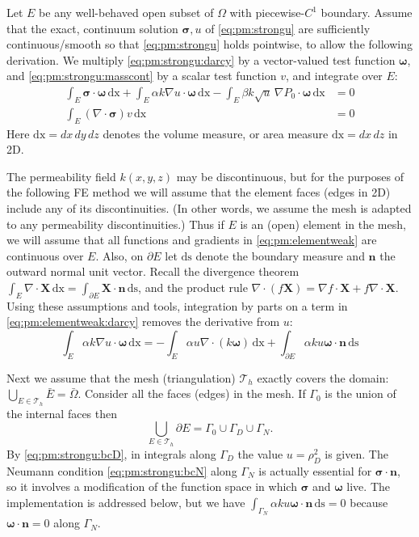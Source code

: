 \documentclass[11pt]{amsart}
\newcommand{\bn}{\mathbf{n}}
\newcommand{\bX}{\mathbf{X}}
\newcommand{\bsigma}{\bm{\sigma}}
\newcommand{\bomega}{\bm{\omega}}
\newcommand{\cT}{\mathcal{T}}
\newcommand{\dx}{\mathrm{dx}}
\newcommand{\ds}{\mathrm{ds}}
\newcommand{\Div}{\nabla\cdot}
\newcommand{\grad}{\nabla}
\begin{document}
Let $E$ be any well-behaved open subset of $\Omega$ with piecewise-$C^1$ boundary.  Assume that the exact, continuum solution $\bsigma,u$ of \eqref{eq:pm:strongu} are sufficiently continuous/smooth so that \eqref{eq:pm:strongu} holds pointwise, to allow the following derivation.  We multiply \eqref{eq:pm:strongu:darcy} by a vector-valued test function $\bomega$, and \eqref{eq:pm:strongu:masscont} by a scalar test function $v$, and integrate over $E$:
\begin{subequations}
\label{eq:pm:elementweak}
\begin{align}
\int_E \bsigma\cdot \bomega\,\dx + \int_E \alpha k \grad u \cdot \bomega\,\dx - \int_E \beta k \sqrt{u}\,\grad P_0 \cdot \bomega\,\dx &= 0 \label{eq:pm:elementweak:darcy} \\
\int_E (\Div \bsigma) v\,\dx &= 0 \label{eq:pm:elementweak:masscont}
\end{align}
\end{subequations}
Here $\dx = dx\,dy\,dz$ denotes the volume measure, or area measure $\dx = dx\,dz$ in 2D.

The permeability field $k(x,y,z)$ may be discontinuous, but for the purposes of the following FE method we will assume that the element faces (edges in 2D) include any of its discontinuities.  (In other words, we assume the mesh is adapted to any permeability discontinuities.)  Thus if $E$ is an (open) element in the mesh, we will assume that all functions and gradients in \eqref{eq:pm:elementweak} are continuous over $E$.  Also, on $\partial E$ let $\ds$ denote the boundary measure and $\bn$ the outward normal unit vector.  Recall the divergence theorem $\int_E \Div \bX\,\dx = \int_{\partial E} \bX\cdot \bn\,\ds$, and the product rule $\Div(f\bX) = \grad f \cdot \bX + f \Div \bX$.  Using these assumptions and tools, integration by parts on a term in \eqref{eq:pm:elementweak:darcy} removes the derivative from $u$:
\begin{equation}
\int_E \alpha k \grad u \cdot \bomega\,\dx = - \int_E \alpha u \Div\left(k \bomega\right)\,\dx + \int_{\partial E} \alpha k u \bomega\cdot\bn\,\ds \label{eq:elementweak:ibp}
\end{equation}

Next we assume that the mesh (triangulation) $\cT_h$ exactly covers the domain: $\bigcup_{E\in\cT_h} \bar E = \bar \Omega$.  Consider all the faces (edges) in the mesh.  If $\Gamma_0$ is the union of the internal faces then
\begin{equation}
\bigcup_{E\in\cT_h} \partial E = \Gamma_0 \cup \Gamma_D \cup \Gamma_N.
\end{equation}
By \eqref{eq:pm:strongu:bcD}, in integrals along $\Gamma_D$ the value $u=\rho_D^2$ is given.  The Neumann condition \eqref{eq:pm:strongu:bcN} along $\Gamma_N$ is actually essential for $\bsigma\cdot\bn$, so it involves a modification of the function space in which $\bsigma$ and $\bomega$ live.  The implementation is addressed below, but we have $\int_{\Gamma_N} \alpha k u \bomega\cdot\bn\,\ds = 0$ because $\bomega\cdot\bn=0$ along $\Gamma_N$.
\end{document}

